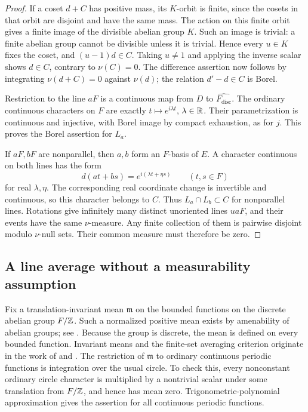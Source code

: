 \begin{proof}
If a coset $d+C$ has positive mass, its $K$-orbit is finite, since the
cosets in that orbit are disjoint and have the same mass. The action on
this finite orbit gives a finite image of the divisible abelian group
$K$. Such an image is trivial: a finite abelian group cannot be divisible
unless it is trivial. Hence every $u\in K$ fixes the coset, and
$(u-1)d\in C$. Taking $u\ne1$ and applying the inverse scalar shows
$d\in C$, contrary to $\nu(C)=0$. The difference assertion now follows
by integrating $\nu(d+C)=0$ against $\nu(d)$; the relation
$d'-d\in C$ is Borel.

Restriction to the line $aF$ is a continuous map from $D$ to
$\widehat{F_{\mathrm{disc}}}$. The ordinary continuous characters on $F$
are exactly $t\mapsto e^{i\lambda t}$, $\lambda\in\mathbb R$. Their
parametrization is continuous and injective, with Borel image by compact
exhaustion, as for $j$. This proves the Borel assertion for $L_a$.

If $aF,bF$ are nonparallel, then $a,b$ form an $F$-basis of $E$. A
character continuous on both lines has the form
\[
 d(at+bs)=e^{i(\lambda t+\eta s)}\qquad(t,s\in F)
\]
for real $\lambda,\eta$. The corresponding real coordinate change is
invertible and continuous, so this character belongs to $C$. Thus
$L_a\cap L_b\subset C$ for nonparallel lines. Rotations give infinitely
many distinct unoriented lines $uaF$, and their events have the same
$\nu$-measure. Any finite collection of them is pairwise disjoint modulo
$\nu$-null sets. Their common measure must therefore be zero.
\end{proof}

\subsection{A line average without a measurability assumption}

Fix a translation-invariant mean $\mathfrak m$ on the bounded functions
on the discrete abelian group $F/\mathbb Z$. Such a normalized positive mean
exists by amenability of abelian groups; see
\citet[Theorem~G.2.1]{Bekka2008}. Because the group is discrete,
the mean is defined on every bounded function. Invariant means and
the finite-set averaging criterion originate in the work of
\citet{vonNeumann1929} and \citet{Folner1955}. The restriction of
$\mathfrak m$ to ordinary continuous periodic functions is integration
over the usual circle. To check this, every nonconstant ordinary circle
character is multiplied by a nontrivial scalar under some translation
from $F/\mathbb Z$, and hence has mean zero. Trigonometric-polynomial
approximation gives the assertion for all continuous periodic functions.

